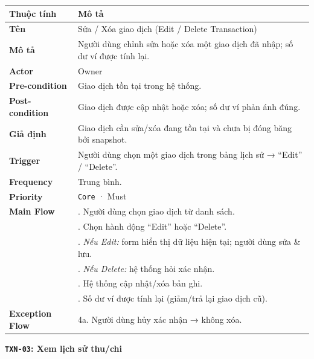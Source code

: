 \documentclass[11pt,a4paper]{article}
\newcounter{none}
\newcommand{\faintline}{\noalign{\global\arrayrulecolor{faintgray}}\hline\noalign{\global\arrayrulecolor{black}}} %
\begin{document}
{\def\LTcaptype{none}
\begin{longtable}[]{@{}
  >{\raggedright\arraybackslash}p{}
  >{\raggedright\arraybackslash}p{}@{}}
\toprule\noalign{}
\begin{minipage}[b]{\linewidth}\raggedright
Thuộc tính
\end{minipage} & \begin{minipage}[b]{\linewidth}\raggedright
Mô tả
\end{minipage} \\
\midrule\noalign{}
\endhead
\bottomrule\noalign{}
\endlastfoot
\textbf{Tên} & Sửa / Xóa giao dịch (Edit / Delete Transaction) \\ \faintline
\textbf{Mô tả} & Người dùng chỉnh sửa hoặc xóa một giao dịch đã nhập; số dư ví được tính lại. \\ \faintline
\textbf{Actor} & Owner \\ \faintline
\textbf{Pre-condition} & Giao dịch tồn tại trong hệ thống. \\ \faintline
\textbf{Post-condition} & Giao dịch được cập nhật hoặc xóa; số dư ví phản ánh đúng. \\ \faintline
\textbf{Giả định} & Giao dịch cần sửa/xóa đang tồn tại và chưa bị đóng băng bởi snapshot. \\ \faintline
\textbf{Trigger} & Người dùng chọn một giao dịch trong bảng lịch sử → ``Edit'' / ``Delete''. \\ \faintline
\textbf{Frequency} & Trung bình. \\ \faintline
\textbf{Priority} & \texttt{Core} · Must \\ \faintline
\textbf{Main Flow} & 1. Người dùng chọn giao dịch từ danh sách.\\ 
&2. Chọn hành động ``Edit'' hoặc ``Delete''.\\
&3. \emph{Nếu Edit:} form hiển thị dữ liệu hiện tại; người dùng sửa \& lưu.\\
&4. \emph{Nếu Delete:} hệ thống hỏi xác nhận. \\
&5. Hệ thống cập nhật/xóa bản ghi. \\
&6. Số dư ví được tính lại (giảm/trả lại giao dịch cũ). \\ \faintline
\textbf{Exception Flow} & 4a. Người dùng hủy xác nhận → không xóa. \\
\end{longtable}
}

\textbf{\texttt{TXN-03}: Xem lịch sử thu/chi}
\end{document}
